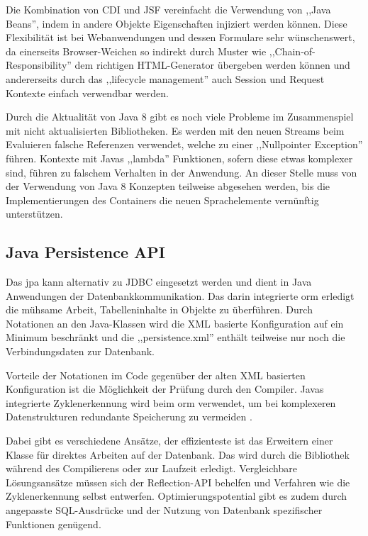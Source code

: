 \documentclass[oneside, ngerman, toc=bibliography,bibliography=totoc,listof=entryprefix, open=right,numbers=noenddot,fontsize=12pt]{scrbook}
\begin{document}
Die Kombination von {CDI} und {JSF} vereinfacht die Verwendung von ,,Java Beans'', indem in andere Objekte Eigenschaften injiziert werden können. Diese Flexibilität ist bei Webanwendungen und dessen Formulare sehr wünschenswert, da einerseits Browser-Weichen so indirekt durch Muster wie  ,,Chain-of-Responsibility'' dem richtigen HTML-Generator übergeben werden können und andererseits durch das ,,lifecycle management'' auch Session und Request Kontexte einfach verwendbar werden. 

Durch die Aktualität von Java 8 gibt es noch viele Probleme im Zusammenspiel mit nicht aktualisierten Bibliotheken. Es werden mit den neuen Streams beim Evaluieren falsche Referenzen verwendet, welche zu einer ,,Nullpointer Exception'' führen. Kontexte mit Javas ,,lambda'' Funktionen, sofern diese etwas komplexer sind, führen zu falschem Verhalten in der Anwendung.
An dieser Stelle muss von der Verwendung von Java 8 Konzepten teilweise abgesehen werden, bis die Implementierungen des Containers die neuen Sprachelemente vernünftig unterstützen.




\subsection{Java Persistence API}
\label{chap:jpa}

Das \acrfull{jpa} kann alternativ zu {JDBC} eingesetzt werden und dient in Java Anwendungen der Datenbankkommunikation. Das darin integrierte \acrfull{orm} erledigt die mühsame Arbeit, Tabelleninhalte in Objekte zu überführen. Durch Notationen an den Java-Klassen wird die XML basierte Konfiguration auf ein Minimum beschränkt und die ,,persistence.xml'' enthält teilweise nur noch die Verbindungsdaten zur Datenbank.

Vorteile der Notationen im Code gegenüber der alten {XML} basierten Konfiguration ist die Möglichkeit der Prüfung durch den Compiler. Javas integrierte Zyklenerkennung wird beim \acrshort{orm} verwendet, um bei komplexeren Datenstrukturen redundante Speicherung zu vermeiden \cite{inden2012weg}.


Dabei gibt es verschiedene Ansätze, der effizienteste ist das Erweitern einer Klasse für direktes Arbeiten auf der Datenbank. Das wird durch die Bibliothek während des Compilierens oder zur Laufzeit erledigt. Vergleichbare  Lösungsansätze müssen sich der Reflection-API behelfen und Verfahren wie die Zyklenerkennung selbst entwerfen.
Optimierungspotential gibt es zudem durch angepasste SQL-Ausdrücke und der Nutzung von Datenbank spezifischer Funktionen genügend.
\end{document}
